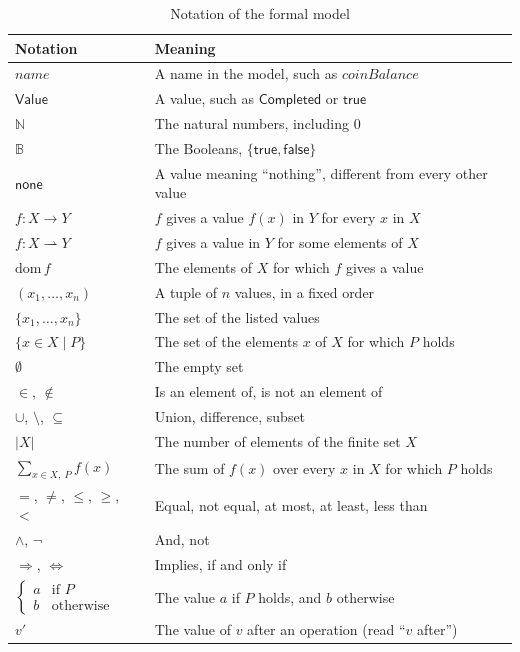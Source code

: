 \documentclass[12pt]{article}
\newcommand{\val}[1]{\ensuremath{\mathsf{#1}}}
\begin{document}
\begin{table}[H]
\centering
\caption{Notation of the formal model}
\label{tab:FormalNotation}
\renewcommand{\arraystretch}{1.15}
\begin{tabular}{ll}
\toprule
\textbf{Notation} & \textbf{Meaning}\\
\midrule
$\mathit{name}$ & A name in the model, such as $\mathit{coinBalance}$\\
\val{Value} & A value, such as \val{Completed} or \val{true}\\
$\mathbb{N}$ & The natural numbers, including $0$\\
$\mathbb{B}$ & The Booleans, $\{\val{true}, \val{false}\}$\\
\val{none} & A value meaning ``nothing'', different from every other value\\
$f : X \to Y$ & $f$ gives a value $f(x)$ in $Y$ for every $x$ in $X$\\
$f : X \rightharpoonup Y$ & $f$ gives a value in $Y$ for some elements of $X$\\
$\mathrm{dom}\, f$ & The elements of $X$ for which $f$ gives a value\\
$(x_1, \ldots, x_n)$ & A tuple of $n$ values, in a fixed order\\
$\{x_1, \ldots, x_n\}$ & The set of the listed values\\
$\{x \in X \mid P\}$ & The set of the elements $x$ of $X$ for which $P$
  holds\\
$\emptyset$ & The empty set\\
$\in$, $\notin$ & Is an element of, is not an element of\\
$\cup$, $\setminus$, $\subseteq$ & Union, difference, subset\\
$|X|$ & The number of elements of the finite set $X$\\
$\sum_{x \in X,\ P} f(x)$ & The sum of $f(x)$ over every $x$ in $X$ for which
  $P$ holds\\
$=$, $\neq$, $\leq$, $\geq$, $<$ & Equal, not equal, at most, at least,
  less than\\
$\wedge$, $\neg$ & And, not\\
$\Rightarrow$, $\Leftrightarrow$ & Implies, if and only if\\
$\begin{cases} a & \text{if } P\\ b & \text{otherwise} \end{cases}$ &
  The value $a$ if $P$ holds, and $b$ otherwise\\
$v'$ & The value of $v$ after an operation (read ``$v$ after'')\\
\bottomrule
\end{tabular}
\end{table}
\end{document}

